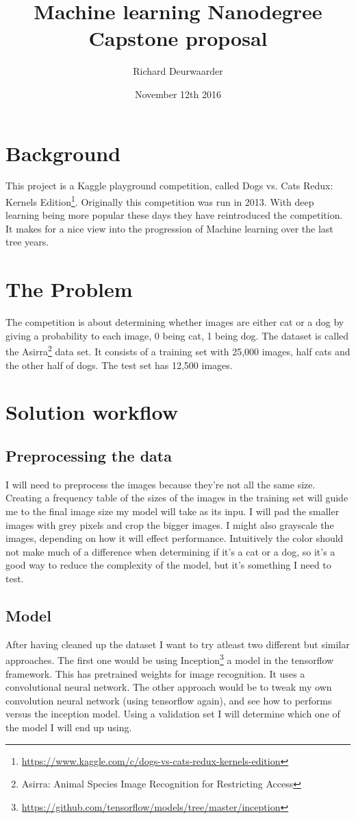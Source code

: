 \documentclass[11pt]{article}
\title{\textbf{Machine learning Nanodegree\\ Capstone proposal}}
\author{Richard Deurwaarder}
\date{November 12th 2016}
\begin{document}
\maketitle

\section{Background}
This project is a Kaggle playground competition, called Dogs vs. Cats Redux: Kernels Edition\footnote{\url{https://www.kaggle.com/c/dogs-vs-cats-redux-kernels-edition}}. Originally this competition was run in 2013. With deep learning being more popular these days they have reintroduced the competition. It makes for a nice view into the  progression of Machine learning over the last tree years.
\section{The Problem}
The competition is about determining whether images are either cat or a dog by giving a probability to each image, 0 being cat, 1 being dog. The dataset is called the Asirra\footnote{Asirra: Animal Species Image Recognition for Restricting Access} data set. It consists of a training set with 25,000 images, half cats and the other half of dogs. The test set has 12,500 images.
\section{Solution workflow}
\subsection{Preprocessing the data}
I will need to preprocess the images because they're not all the same size. Creating a frequency table of the sizes of the images in the training set will guide me to the final image size my model will take as its inpu. I will  pad the smaller images with grey pixels and crop the bigger images. I might also grayscale the images, depending on how it will effect performance. Intuitively the color should not make much of a difference when determining if it's a cat or a dog, so it's a good way to reduce the complexity of the model, but it's something I need to test.

\subsection{Model}
After having cleaned up the dataset I want to try atleast two different but similar approaches. The first one would be using Inception\footnote{\url{https://github.com/tensorflow/models/tree/master/inception}} a model in the tensorflow framework. This has pretrained weights for image recognition. It uses a convolutional neural network.
The other approach would be to tweak my own convolution neural network (using tensorflow again), and see how to performs versus the inception model. Using a validation set I will determine which one of the model I will end up using.
\end{document}
